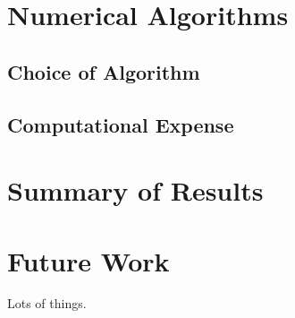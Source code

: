 \section{Numerical Algorithms}
\subsection{Choice of Algorithm}
\subsection{Computational Expense}

\section{Summary of Results}

\section{Future Work}
Lots of things.
